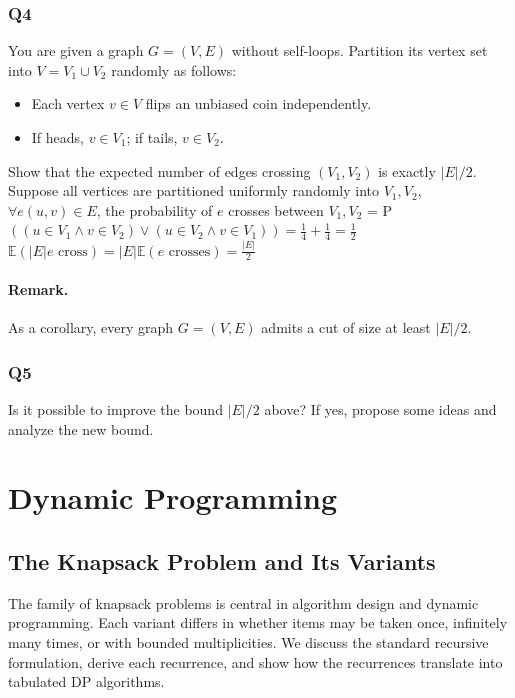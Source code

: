 \documentclass[9pt]{extarticle}
\begin{document}
\subsubsection*{Q4}
You are given a graph $G = (V,E)$ without self-loops. Partition its vertex set into $V = V_1 \cup V_2$ randomly as follows:
\begin{itemize}
    \item Each vertex $v \in V$ flips an unbiased coin independently.
    \item If heads, $v \in V_1$; if tails, $v \in V_2$.
\end{itemize}

Show that the expected number of edges crossing $(V_1, V_2)$ is exactly $|E|/2$.\\
Suppose all vertices are partitioned uniformly randomly into $V_1, V_2$, $\forall e(u,v) \in E$, the probability of $e$ crosses 
between $V_1, V_2$ = P$\left((u\in V_1 \land v \in V_2) \lor (u\in V_2 \land v\in V_1)\right) = \frac{1}{4} + \frac{1}{4} = \frac{1}{2}$\\
$\mathbb{E}(|E| e \text{ cross}) = |E| \mathbb{E}(e \text{ crosses}) = \frac{|E|}{2}$ 
\paragraph{Remark.} As a corollary, every graph $G = (V,E)$ admits a cut of size at least $|E|/2$.

\subsubsection*{Q5}
Is it possible to improve the bound $|E|/2$ above?  
If yes, propose some ideas and analyze the new bound.

\newpage
\section{Dynamic Programming}
\subsection{The Knapsack Problem and Its Variants}

The family of knapsack problems is central in algorithm design and dynamic
programming.  Each variant differs in whether items may be taken once, 
infinitely many times, or with bounded multiplicities.  
We discuss the standard recursive formulation, derive each recurrence, and 
show how the recurrences translate into tabulated DP algorithms.
\end{document}
